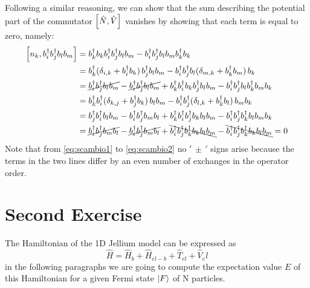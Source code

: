 \documentclass[a4paper]{article}
\begin{document}
Following a similar reasoning, we can show that the sum describing the potential part of the commutator $\comm{\hat{N}}{\hat{V}}$ vanishes by showing that each term is equal to zero, namely:
\begin{align}
\comm{n_k}{b^\dag_i b^\dag_j b_l b_m} 
&= b^\dag_k b_k b^\dag_i b^\dag_j b_l b_m - b^\dag_i b^\dag_j b_l b_m b^\dag_k b_k  \\
&= b^\dag_k \pqty*{\delta_{i,k} + b^\dag_i b_k} b^\dag_j b_l b_m - b^\dag_i b^\dag_j b_l \pqty*{\delta_{m,k} + b^\dag_k b_m} b_k \\
&= \cancel{b^\dag_i b^\dag_j b_l b_m} - \cancel{b^\dag_i b^\dag_j b_l b_m} + b^\dag_k b^\dag_i b_k b^\dag_j b_l b_m -  b^\dag_i b^\dag_j b_l b^\dag_k b_m b_k \\
&= b^\dag_k b^\dag_i \pqty*{\delta_{k,j} + b^\dag_j b_k} b_l b_m - b^\dag_i b^\dag_j \pqty*{\delta_{l,k} + b^\dag_k b_l} b_m b_k \\
&= b^\dag_j b^\dag_i b_l b_m - b^\dag_i b^\dag_j  b_m b_l + b^\dag_k b^\dag_i b^\dag_j b_k b_l b_m - b^\dag_i b^\dag_j b^\dag_k b_l b_m b_k \label{eq:scambio1} \\
&= \cancel{b^\dag_i b^\dag_j b_m b_l} - \cancel{b^\dag_i b^\dag_j  b_m b_l} + \bcancel{b^\dag_i b^\dag_j b^\dag_k b_k b_l b_m} - \bcancel{b^\dag_i b^\dag_j b^\dag_k b_k b_l b_m} =0 \label{eq:scambio2}
\end{align}
Note that from \eqref{eq:scambio1} to \eqref{eq:scambio2} no $'\, \pm\,'$ signs arise because the terms in the two lines differ by an even number of exchanges in the operator order.




\section*{Second Exercise}
\noindent The Hamiltonian of the 1D Jellium model can be expressed as
\begin{equation} \hat{H} = \hat{H}_b + \hat{H}_{el-b} + \hat{T}_{el} + \hat{V}_el\end{equation}
in the following paragraphs we are going to compute the expectation value $E$ of this Hamiltonian for a given Fermi state $\ket{F}$ of N particles.
\end{document}
